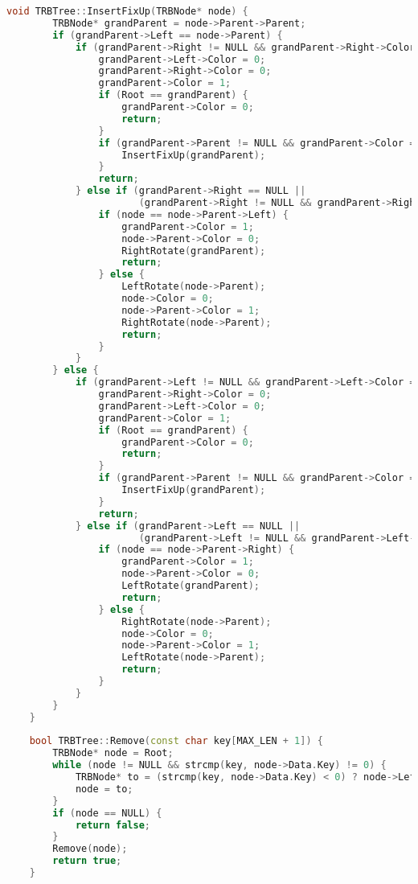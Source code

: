 \begin{lstlisting}[language=C++]
    void TRBTree::InsertFixUp(TRBNode* node) {
        TRBNode* grandParent = node->Parent->Parent;
        if (grandParent->Left == node->Parent) {
            if (grandParent->Right != NULL && grandParent->Right->Color == 1) {
                grandParent->Left->Color = 0;
                grandParent->Right->Color = 0;
                grandParent->Color = 1;
                if (Root == grandParent) {
                    grandParent->Color = 0;
                    return;
                }
                if (grandParent->Parent != NULL && grandParent->Color == 1 && grandParent->Parent->Color == 1) {
                    InsertFixUp(grandParent);
                }
                return;
            } else if (grandParent->Right == NULL ||
                       (grandParent->Right != NULL && grandParent->Right->Color == 0)) {
                if (node == node->Parent->Left) {
                    grandParent->Color = 1;
                    node->Parent->Color = 0;
                    RightRotate(grandParent);
                    return;
                } else {
                    LeftRotate(node->Parent);
                    node->Color = 0;
                    node->Parent->Color = 1;
                    RightRotate(node->Parent);
                    return;
                }
            }
        } else {
            if (grandParent->Left != NULL && grandParent->Left->Color == 1) {
                grandParent->Right->Color = 0;
                grandParent->Left->Color = 0;
                grandParent->Color = 1;
                if (Root == grandParent) {
                    grandParent->Color = 0;
                    return;
                }
                if (grandParent->Parent != NULL && grandParent->Color == 1 && grandParent->Parent->Color == 1) {
                    InsertFixUp(grandParent);
                }
                return;
            } else if (grandParent->Left == NULL ||
                       (grandParent->Left != NULL && grandParent->Left->Color == 0 )) {
                if (node == node->Parent->Right) {
                    grandParent->Color = 1;
                    node->Parent->Color = 0;
                    LeftRotate(grandParent);
                    return;
                } else {
                    RightRotate(node->Parent);
                    node->Color = 0;
                    node->Parent->Color = 1;
                    LeftRotate(node->Parent);
                    return;
                }
            }
        }
    }
    
    bool TRBTree::Remove(const char key[MAX_LEN + 1]) {
        TRBNode* node = Root;
        while (node != NULL && strcmp(key, node->Data.Key) != 0) {
            TRBNode* to = (strcmp(key, node->Data.Key) < 0) ? node->Left : node->Right;
            node = to;
        }
        if (node == NULL) {
            return false;
        }
        Remove(node);
        return true;
    }


\end{lstlisting}
